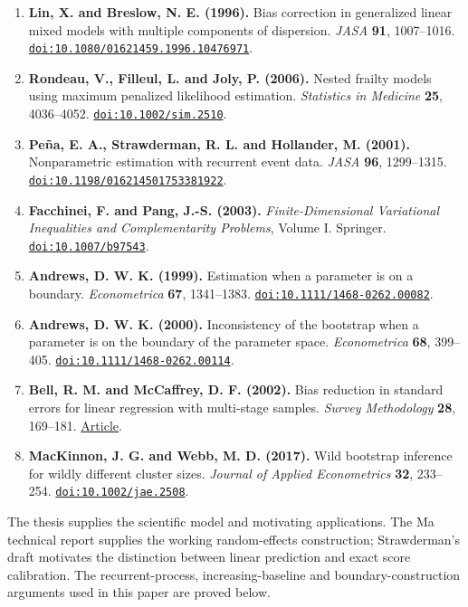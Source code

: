 \documentclass[11pt]{article}
\begin{document}
\begin{enumerate}
  \item\label{ref:9} \textbf{Lin, X. and Breslow, N. E. (1996).} Bias correction in generalized linear mixed models with multiple components of dispersion. \emph{JASA} \textbf{91}, 1007--1016. \href{https://doi.org/10.1080/01621459.1996.10476971}{\nolinkurl{doi:10.1080/01621459.1996.10476971}}.
  \item\label{ref:10} \textbf{Rondeau, V., Filleul, L. and Joly, P. (2006).} Nested frailty models using maximum penalized likelihood estimation. \emph{Statistics in Medicine} \textbf{25}, 4036--4052. \href{https://doi.org/10.1002/sim.2510}{\nolinkurl{doi:10.1002/sim.2510}}.
  \item\label{ref:11} \textbf{Peña, E. A., Strawderman, R. L. and Hollander, M. (2001).} Nonparametric estimation with recurrent event data. \emph{JASA} \textbf{96}, 1299--1315. \href{https://doi.org/10.1198/016214501753381922}{\nolinkurl{doi:10.1198/016214501753381922}}.
  \item\label{ref:12} \textbf{Facchinei, F. and Pang, J.-S. (2003).} \emph{Finite-Dimensional Variational Inequalities and Complementarity Problems}, Volume I. Springer. \href{https://doi.org/10.1007/b97543}{\nolinkurl{doi:10.1007/b97543}}.
  \item\label{ref:13} \textbf{Andrews, D. W. K. (1999).} Estimation when a parameter is on a boundary. \emph{Econometrica} \textbf{67}, 1341--1383. \href{https://doi.org/10.1111/1468-0262.00082}{\nolinkurl{doi:10.1111/1468-0262.00082}}.
  \item\label{ref:14} \textbf{Andrews, D. W. K. (2000).} Inconsistency of the bootstrap when a parameter is on the boundary of the parameter space. \emph{Econometrica} \textbf{68}, 399--405. \href{https://doi.org/10.1111/1468-0262.00114}{\nolinkurl{doi:10.1111/1468-0262.00114}}.
  \item\label{ref:15} \textbf{Bell, R. M. and McCaffrey, D. F. (2002).} Bias reduction in standard errors for linear regression with multi-stage samples. \emph{Survey Methodology} \textbf{28}, 169--181. \href{https://www150.statcan.gc.ca/n1/pub/12-001-x/2002002/article/9058-eng.pdf}{Article}.
  \item\label{ref:16} \textbf{MacKinnon, J. G. and Webb, M. D. (2017).} Wild bootstrap inference for wildly different cluster sizes. \emph{Journal of Applied Econometrics} \textbf{32}, 233--254. \href{https://doi.org/10.1002/jae.2508}{\nolinkurl{doi:10.1002/jae.2508}}.
\end{enumerate}

The thesis supplies the scientific model and motivating applications. The Ma technical report supplies the working random-effects construction; Strawderman's draft motivates the distinction between linear prediction and exact score calibration. The recurrent-process, increasing-baseline and boundary-construction arguments used in this paper are proved below.
\end{document}
